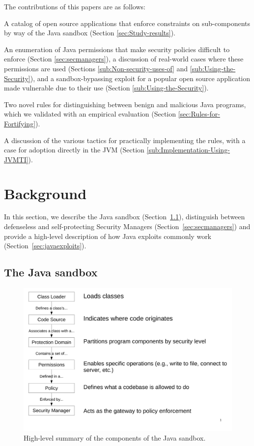 \documentclass{sig-alternate}
\begin{document}
The contributions of this papers are as follows:
\begin{flushitem}	\setlength{\parskip}{0pt}
  \setlength{\parsep}{0pt}
  \setlength{\itemsep}{0pt}
\item A catalog of open source applications that enforce constraints on sub-components by way of the Java sandbox (Section \ref{sec:Study-results}).
\item An enumeration of Java permissions that make security policies difficult to enforce (Section \ref{sec:secmanagers}), a discussion of real-world cases where these permissions are used (Sections \ref{sub:Non-security-uses-of} and \ref{sub:Using-the-Security}), and a sandbox-bypassing exploit for a popular open source application made vulnerable due to their use (Section \ref{sub:Using-the-Security}).
\item Two novel rules for distinguishing between benign and malicious Java programs, which we validated with an empirical evaluation (Section \ref{sec:Rules-for-Fortifying}).
\item A discussion of the various tactics for practically implementing the rules, with a case for adoption directly in the JVM (Section \ref{sub:Implementation-Using-JVMTI}).
\end{flushitem}

\section{Background}\label{sec:Background}

In this section, we describe the Java sandbox
(Section~\ref{sec:sandbox}), distinguish between defenseless and self-protecting
Security Managers (Section~\ref{sec:secmanagers}) and provide a high-level
description of how Java exploits commonly work
(Section~\ref{sec:javaexploits}). 

\subsection{The Java sandbox}
\label{sec:sandbox}

\begin{figure}
\includegraphics[width=\columnwidth]{sandbox_overview}
\caption{High-level summary of the components of the Java 
\label{fig:Sandbox-high-level-summary}
sandbox.}
\end{figure}
\end{document}
